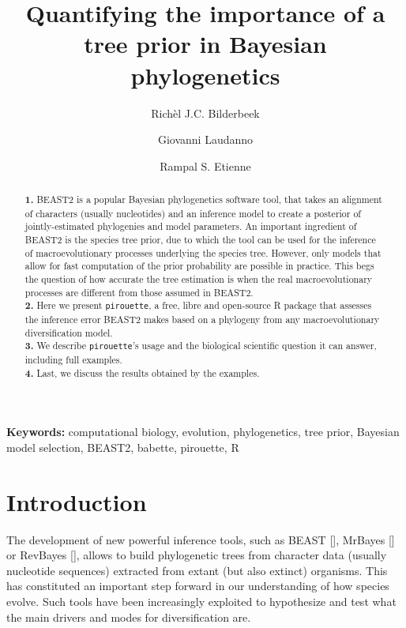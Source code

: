 \documentclass{article}
\title{
  Quantifying the importance of a tree prior in Bayesian phylogenetics
}
\author[1]{Rich\`el J.C. Bilderbeek}
\author[1]{Giovanni Laudanno}
\author[1]{Rampal S. Etienne}
\affil[1]{Groningen Institute for Evolutionary Life Sciences, University of 
Groningen, Groningen, The Netherlands}
\begin{document}
\maketitle

\begin{abstract}

  \textbf{1. }
    BEAST2 is a popular Bayesian phylogenetics software tool,
    that takes an alignment of characters (usually nucleotides) 
    and an inference model to create a
    posterior of jointly-estimated phylogenies and model parameters. 
    An important ingredient of BEAST2 is the species tree prior, 
    due to which the tool can be used for the inference of 
    macroevolutionary processes underlying the species tree. 
    However, only models that allow for fast computation of 
    the prior probability are possible in practice. 
    This begs the question of how accurate the tree estimation is 
    when the real macroevolutionary processes are different 
    from those assumed in BEAST2. \\
  \textbf{2. }
    Here we present \verb;pirouette;, 
    a free, libre and open-source R package that assesses 
    the inference error BEAST2 makes based on a 
    phylogeny from any macroevolutionary diversification model. \\
  \textbf{3. }
    We describe \verb;pirouette;'s usage and the biological scientific
    question it can answer, including full examples. \\
  \textbf{4. }
    Last, we discuss the results obtained by the examples. \\
\end{abstract}

{\bf Keywords:} computational biology, evolution, phylogenetics, tree prior,
  Bayesian model selection, BEAST2, babette, pirouette, R

\section{Introduction}

The development of new powerful inference tools, 
such as BEAST [\cite{drummond2007beast}], 
MrBayes [\cite{huelsenbeck2001mrbayes}]
or RevBayes [\cite{hohna2016revbayes}], 
allows to build phylogenetic trees 
from character data (usually nucleotide sequences) extracted 
from extant (but also extinct) organisms.
This has constituted an important step forward 
in our understanding of how species evolve.
Such tools have been increasingly exploited to hypothesize 
and test what the main drivers and modes for diversification are.
\end{document}
